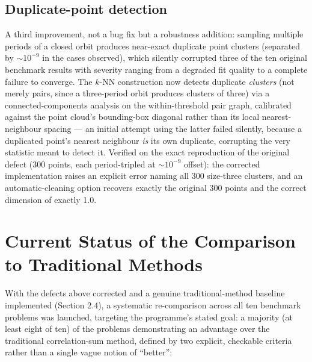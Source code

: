 \documentclass[11pt,a4paper]{article}
\begin{document}
\subsection{Duplicate-point detection}

A third improvement, not a bug fix but a robustness addition: sampling
multiple periods of a closed orbit produces near-exact duplicate point
clusters (separated by $\sim 10^{-9}$ in the cases observed), which
silently corrupted three of the ten original benchmark results with
severity ranging from a degraded fit quality to a complete failure to
converge. The $k$-NN construction now detects duplicate \emph{clusters}
(not merely pairs, since a three-period orbit produces clusters of three)
via a connected-components analysis on the within-threshold pair graph,
calibrated against the point cloud's bounding-box diagonal rather than its
local nearest-neighbour spacing --- an initial attempt using the latter
failed silently, because a duplicated point's nearest neighbour \emph{is}
its own duplicate, corrupting the very statistic meant to detect it.
Verified on the exact reproduction of the original defect (300 points,
each period-tripled at $\sim 10^{-9}$ offset): the corrected implementation
raises an explicit error naming all 300 size-three clusters, and an
automatic-cleaning option recovers exactly the original 300 points and the
correct dimension of exactly 1.0.

\section{Current Status of the Comparison to Traditional Methods}
\label{sec:current-status}

With the defects above corrected and a genuine traditional-method baseline
implemented (Section 2.4), a systematic re-comparison across all ten
benchmark problems was launched, targeting the programme's stated goal: a
majority (at least eight of ten) of the problems demonstrating an
advantage over the traditional correlation-sum method, defined by two
explicit, checkable criteria rather than a single vague notion of
``better'':
\end{document}
